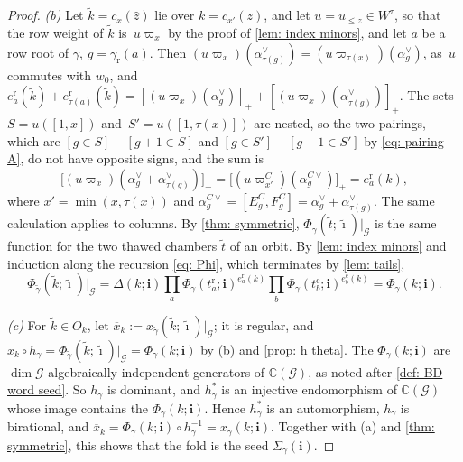 \documentclass[a4paper]{amsart}
\numberwithin{equation}{section}
\theoremstyle{definition}
\theoremstyle{remark}
\newcommand{\bbC}{\mathbb{C}}
\newcommand{\mcG}{\mathcal{G}}
\newcommand{\bfi}{\mathbf{i}}
\newcommand{\tbfi}{\widetilde{\boldsymbol{\imath}}}
\newcommand{\tg}{\widetilde{\gamma}}
\newcommand{\rr}{\mathrm{r}}
\newcommand{\cc}{\mathrm{c}}
\begin{document}
\begin{proof}
  \emph{(b)} Let $\widetilde{k}=c_x(\widehat z)$ lie over $k=c_{x'}(z)$, and let $u=u_{\le z}\in W^\tau$, so that the row weight of $\widetilde{k}$ is~$u\varpi_x$ by the proof of \cref{lem: index minors}, and let $a$ be a row root of $\gamma$, $g=\gamma_{\rr}(a)$.
  Then $(u\varpi_x)(\alpha^\vee_{\tau(g)})=(u\varpi_{\tau(x)})(\alpha^\vee_g)$, as~$u$ commutes with $w_0$, and $e^\rr_a(\widetilde{k})+e^\rr_{\tau(a)}(\widetilde{k})=[(u\varpi_x)(\alpha_g^\vee)]_++[(u\varpi_x)(\alpha_{\tau(g)}^\vee)]_+$.
  The sets $S=u([1,x])$ and~$S'=u([1,\tau(x)])$ are nested, so the two pairings, which are $[g\in S]-[g+1\in S]$ and $[g\in S']-[g+1\in S']$ by \eqref{eq: pairing A}, do not have opposite signs, and the sum is
  \[
    \big[(u\varpi_x)(\alpha_g^\vee+\alpha_{\tau(g)}^\vee)\big]_+=\big[(u\varpi^C_{x'})(\alpha^{C\vee}_g)\big]_+=e^\rr_a(k),
  \]
  where $x'=\min(x,\tau(x))$ and $\alpha^{C\vee}_g=[E^C_g,F^C_g]=\alpha^\vee_g+\alpha^\vee_{\tau(g)}$.
  The same calculation applies to columns.
  By \cref{thm: symmetric}, $\Phi_{\tg}(\widetilde{t};\tbfi)|_\mcG$ is the same function for the two thawed chambers $\widetilde{t}$ of an orbit.
  By \cref{lem: index minors} and induction along the recursion \eqref{eq: Phi}, which terminates by \cref{lem: tails},
  \[
    \Phi_{\tg}(\widetilde{k};\tbfi)|_\mcG=\Delta(k;\bfi)\prod_a\Phi_\gamma(t^\rr_a;\bfi)^{e^\rr_a(k)}\prod_b\Phi_\gamma(t^\cc_b;\bfi)^{e^\cc_b(k)}=\Phi_\gamma(k;\bfi).
  \]

  \emph{(c)} For $\widetilde{k}\in O_k$, let $\overline{x}_k:=x_{\tg}(\widetilde{k};\tbfi)|_\mcG$; it is regular, and $\overline{x}_k\circ h_\gamma=\Phi_{\tg}(\widetilde{k};\tbfi)|_\mcG=\Phi_\gamma(k;\bfi)$ by (b) and \cref{prop: h theta}.
  The $\Phi_\gamma(k;\bfi)$ are $\dim\mcG$ algebraically independent generators of $\bbC(\mcG)$, as noted after \cref{def: BD word seed}.
  So $h_\gamma$ is dominant, and $h_\gamma^*$ is an injective endomorphism of $\bbC(\mcG)$ whose image contains the $\Phi_\gamma(k;\bfi)$.
  Hence $h_\gamma^*$ is an automorphism, $h_\gamma$ is birational, and $\overline{x}_k=\Phi_\gamma(k;\bfi)\circ h_\gamma^{-1}=x_\gamma(k;\bfi)$.
  Together with (a) and \cref{thm: symmetric}, this shows that the fold is the seed $\Sigma_\gamma(\bfi)$.
\end{proof}
\end{document}
